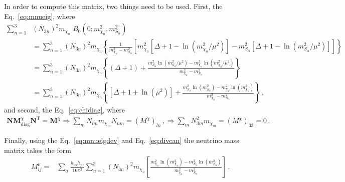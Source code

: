 In order to compute this matrix, two things need to be used. 
First, the Eq.~\eqref{eq:mnueig}, where 
\begin{align}
\label{eq:mnueigdev}
\sum_{n=1}^3& \left( N_{3n} \right)^2m_{\chi_n}\; B_0 \left(0;m_{\chi_n}^2,m^2_{S_\alpha} \right)\nonumber\\
  &=\sum_{n=1}^3 \left( N_{3n} \right)^2m_{\chi_n}
   \left\{\frac{1}{m_{\chi_n}^2-m_{S_\alpha}^2}\left[m^2_{\chi_n} \left[ \Delta+1-\ln \left( m_{\chi_n}^2/\mu^2 \right) \right]   
-m_{S_\alpha}^2 \left[ \Delta+1-\ln \left( m_{S_\alpha}^2/\mu^2 \right) \right]\right] \right\}\nonumber\\
&=\sum_{n=1}^3 \left( N_{3n} \right)^2m_{\chi_n}
   \left\{(\Delta+1)+\frac{m_{S_\alpha}^2\ln \left( m_{S_\alpha}^2/\mu^2 \right)-m_{\chi_n}^2\ln \left( m_{\chi_n}^2/\mu^2 \right)}{m_{\chi_n}^2-m_{S_\alpha}^2} \right\}\nonumber\\
&=\sum_{n=1}^3 \left( N_{3n} \right)^2m_{\chi_n}
   \left\{\left[\Delta+1+\ln\left( \mu^2 \right) \right]+\frac{m_{S_\alpha}^2\ln \left( m_{S_\alpha}^2 \right)-m_{\chi_n}^2\ln \left( m_{\chi_n}^2 \right)}{m_{\chi_n}^2-m_{S_\alpha}^2} \right\}\,,
\end{align}
%
and second, the Eq.~\eqref{eq:chidiag}, where
%
\begin{align}
\label{eq:divcan}
\mathbf{N} \mathbf{M}^\chi_{\text{diag}}\mathbf{N}^{\operatorname{T}}=\mathbf{M}^\chi\Rightarrow \sum_mN_{lm}m_{\chi_m} N_{nm}=(M^\chi)_{ln}\,, \Rightarrow
  \sum_m N_{3m}^2m_{\chi_m}=(M^\chi)_{33}=0\,.
\end{align}
%
 
Finally, using the Eq.~\eqref{eq:mnueigdev} and Eq.~\eqref{eq:divcan} the neutrino mass matrix takes the form
%
\begin{align}
\label{eq:neutrino-mass-matrix}
M^{\nu}_{ij}=&\sum_{\alpha}\frac{h_{i\alpha}h_{j\alpha}}{16\pi^2}\sum_{n=1}^3 \left( N_{3n} \right)^2m_{\chi_n}
\left[ \frac{m_{\chi_n}^2\ln \left( m_{\chi_n}^2 \right)-m_{S_\alpha}^2\ln \left( m_{S_\alpha}^2 \right)}{m_{\chi_n}^2-m_{S_\alpha}^2} \right]\,.
\end{align}







